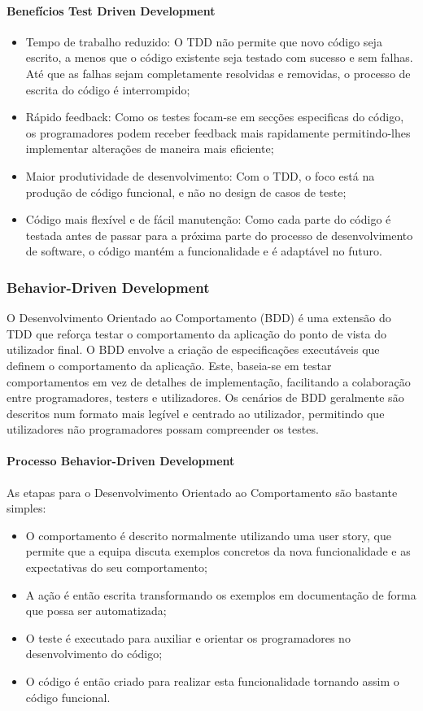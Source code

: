 \documentclass[a4paper,12pt]{article} %
\begin{document}
\paragraph{Benefícios Test Driven Development}
\begin{itemize}
	\item Tempo de trabalho reduzido: O TDD não permite que novo código seja escrito, a menos que o código existente seja testado com sucesso e sem falhas. Até que as falhas sejam completamente resolvidas e removidas, o processo de escrita do código é interrompido;
	\item Rápido feedback: Como os testes focam-se em secções especificas do código, os programadores podem receber feedback mais rapidamente permitindo-lhes implementar alterações de maneira mais eficiente;
	\item Maior produtividade de desenvolvimento: Com o TDD, o foco está na produção de código funcional, e não no design de casos de teste;
	\item Código mais flexível e de fácil manutenção: Como cada parte do código é testada antes de passar para a próxima parte do processo de desenvolvimento de software, o código mantém a funcionalidade e é adaptável no futuro.
\end{itemize}

\newpage
\subsubsection{Behavior-Driven Development}
O Desenvolvimento Orientado ao Comportamento (BDD) é uma extensão do TDD que reforça testar o comportamento da aplicação do ponto de vista do utilizador final. O BDD envolve a criação de especificações executáveis que definem o comportamento da aplicação. Este, baseia-se em testar comportamentos em vez de detalhes de implementação, facilitando a colaboração entre programadores, testers e utilizadores. Os cenários de BDD geralmente são descritos num formato mais legível e centrado ao utilizador, permitindo que utilizadores não programadores possam compreender os testes.

\paragraph{Processo Behavior-Driven Development}
As etapas para o Desenvolvimento Orientado ao Comportamento são bastante simples:

\begin{itemize}
	\item O comportamento é descrito normalmente utilizando uma user story, que permite que a equipa discuta exemplos concretos da nova funcionalidade e as expectativas do seu comportamento;
	\item A ação é então escrita transformando os exemplos em documentação de forma que possa ser automatizada;
	\item O teste é executado para auxiliar e orientar os programadores no desenvolvimento do código;
	\item O código é então criado para realizar esta funcionalidade tornando assim o código funcional.
\end{itemize}
\end{document}
